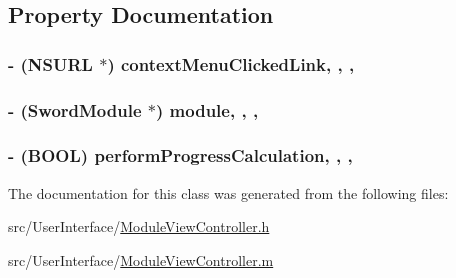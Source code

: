 \subsection{Property Documentation}
\hypertarget{interface_module_view_controller_a79873fe7e12ce6ca97409a0e056bf2de}{
\subsubsection[{context\-Menu\-Clicked\-Link}]{\setlength{\rightskip}{0pt plus 5cm}-\/ (N\-S\-U\-R\-L $\ast$) context\-Menu\-Clicked\-Link\hspace{0.3cm}{\ttfamily [read]}, {\ttfamily [write]}, {\ttfamily [atomic]}, {\ttfamily [retain]}}}\label{interface_module_view_controller_a79873fe7e12ce6ca97409a0e056bf2de}
\hypertarget{interface_module_view_controller_a4d9ff35b74c4bbf911e200fd553a7090}{
\subsubsection[{module}]{\setlength{\rightskip}{0pt plus 5cm}-\/ ({\bf Sword\-Module} $\ast$) module\hspace{0.3cm}{\ttfamily [read]}, {\ttfamily [write]}, {\ttfamily [atomic]}, {\ttfamily [retain]}}}\label{interface_module_view_controller_a4d9ff35b74c4bbf911e200fd553a7090}
\hypertarget{interface_module_view_controller_af810dd4770996b23d6ba667b91fc33f1}{
\subsubsection[{perform\-Progress\-Calculation}]{\setlength{\rightskip}{0pt plus 5cm}-\/ (B\-O\-O\-L) perform\-Progress\-Calculation\hspace{0.3cm}{\ttfamily [read]}, {\ttfamily [write]}, {\ttfamily [atomic]}, {\ttfamily [assign]}}}\label{interface_module_view_controller_af810dd4770996b23d6ba667b91fc33f1}


The documentation for this class was generated from the following files\-:\begin{DoxyCompactItemize}
\item 
src/\-User\-Interface/\hyperlink{_module_view_controller_8h}{Module\-View\-Controller.\-h}\item 
src/\-User\-Interface/\hyperlink{_module_view_controller_8m}{Module\-View\-Controller.\-m}\end{DoxyCompactItemize}
